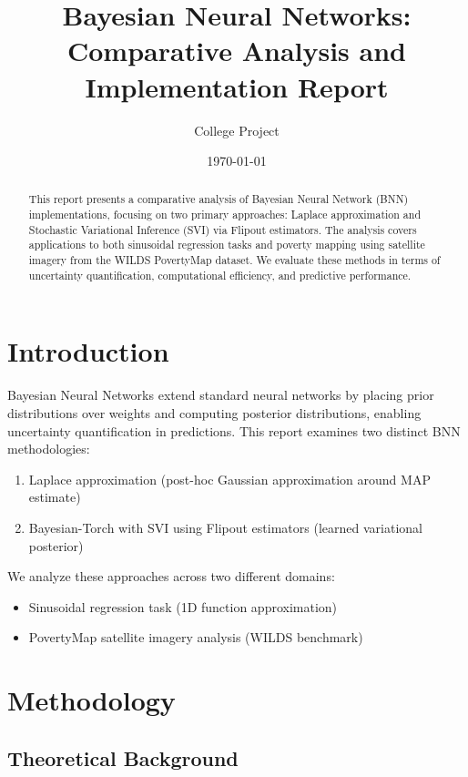 \documentclass[11pt]{article}
\title{Bayesian Neural Networks: Comparative Analysis and Implementation Report}
\author{College Project}
\date{\today}
\begin{document}
\maketitle

\begin{abstract}
This report presents a comparative analysis of Bayesian Neural Network (BNN) implementations, focusing on two primary approaches: Laplace approximation and Stochastic Variational Inference (SVI) via Flipout estimators. The analysis covers applications to both sinusoidal regression tasks and poverty mapping using satellite imagery from the WILDS PovertyMap dataset. We evaluate these methods in terms of uncertainty quantification, computational efficiency, and predictive performance.
\end{abstract}

\section{Introduction}
Bayesian Neural Networks extend standard neural networks by placing prior distributions over weights and computing posterior distributions, enabling uncertainty quantification in predictions. This report examines two distinct BNN methodologies:
\begin{enumerate}
    \item Laplace approximation (post-hoc Gaussian approximation around MAP estimate)
    \item Bayesian-Torch with SVI using Flipout estimators (learned variational posterior)
\end{enumerate}

We analyze these approaches across two different domains:
\begin{itemize}
    \item Sinusoidal regression task (1D function approximation)
    \item PovertyMap satellite imagery analysis (WILDS benchmark)
\end{itemize}

\section{Methodology}

\subsection{Theoretical Background}
\end{document}
